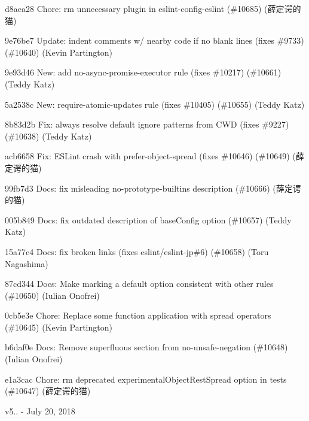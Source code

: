 \begin{DoxyItemize}
\item d8aea28 Chore\+: rm unnecessary plugin in eslint-\/config-\/eslint (\#10685) (薛定谔的猫)
\item 9e76be7 Update\+: indent comments w/ nearby code if no blank lines (fixes \#9733) (\#10640) (Kevin Partington)
\item 9e93d46 New\+: add no-\/async-\/promise-\/executor rule (fixes \#10217) (\#10661) (Teddy Katz)
\item 5a2538c New\+: require-\/atomic-\/updates rule (fixes \#10405) (\#10655) (Teddy Katz)
\item 8b83d2b Fix\+: always resolve default ignore patterns from CWD (fixes \#9227) (\#10638) (Teddy Katz)
\item acb6658 Fix\+: ESLint crash with prefer-\/object-\/spread (fixes \#10646) (\#10649) (薛定谔的猫)
\item 99fb7d3 Docs\+: fix misleading no-\/prototype-\/builtins description (\#10666) (薛定谔的猫)
\item 005b849 Docs\+: fix outdated description of {\ttfamily base\+Config} option (\#10657) (Teddy Katz)
\item 15a77c4 Docs\+: fix broken links (fixes eslint/eslint-\/jp\#6) (\#10658) (Toru Nagashima)
\item 87cd344 Docs\+: Make marking a default option consistent with other rules (\#10650) (Iulian Onofrei)
\item 0cb5e3e Chore\+: Replace some function application with spread operators (\#10645) (Kevin Partington)
\item b6daf0e Docs\+: Remove superfluous section from no-\/unsafe-\/negation (\#10648) (Iulian Onofrei)
\item e1a3cac Chore\+: rm deprecated experimental\+Object\+Rest\+Spread option in tests (\#10647) (薛定谔的猫)
\end{DoxyItemize}

v5.. -\/ July 20, 2018


